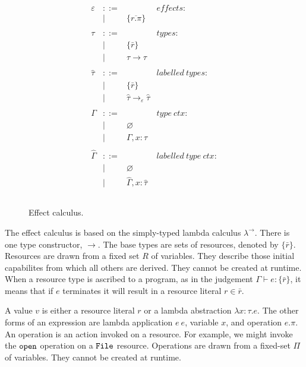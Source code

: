 \begin{figure}[h]
\[\begin{array}{lll}
\begin{array}{lllr}
\varepsilon & ::= & ~ & effects: \\
	& | & \{ \overline{r.\pi} \} \\
	&&\\

\tau & ::= & ~ & types: \\
		& | & \{ \bar r \} \\
		& | & \tau \rightarrow \tau \\ 
		&&\\

\hat \tau & ::= & ~ & labelled ~types: \\
		& | & \{ \bar r \} \\
		& | & \hat \tau \rightarrow_{\varepsilon} \hat \tau \\
		&&\\

\Gamma & ::= & ~ & type~ctx: \\
				& | & \varnothing \\
				& | & \Gamma, x: \tau \\
				&&\\
				
\hat \Gamma & ::= & ~ & labelled~type~ctx:\\
				& | & \varnothing \\
				& | & \hat \Gamma, x: \hat \tau \\
				&&\\

\end{array}

\end{array}
\]

\vspace{-7pt}
\caption{Effect calculus.}
\label{This is the label.}
\end{figure}

The effect calculus is based on the simply-typed lambda calculus $\lambda^{\rightarrow}$. There is one type constructor, $\rightarrow$. The base types are sets of resources, denoted by $\{ \bar r \}$. Resources are drawn from a fixed set $R$ of variables. They describe those initial capabilites from which all others are derived. They cannot be created at runtime. When a resource type is ascribed to a program, as in the judgement $\Gamma \vdash e: \{ \bar r \}$, it means that if $e$ terminates it will result in a resource literal $r \in \bar r$.

A value $v$ is either a resource literal $r$ or a lambda abstraction $\lambda x: \tau.e$. The other forms of an expression are lambda application $e~e$, variable $x$, and operation $e.\pi$. An operation is an action invoked on a resource. For example, we might invoke the $\mathtt{open}$ operation on a $\mathtt{File}$ resource. Operations are drawn from a fixed-set $\Pi$ of variables. They cannot be created at runtime.


